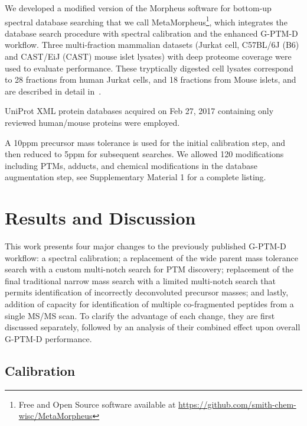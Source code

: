\documentclass[journal=jprobs,manuscript=article]{achemso}
\begin{document}
We developed a modified version of the Morpheus software for bottom-up spectral database searching\citep{Wenger_2013} that we call MetaMorpheus\footnote{Free and Open Source software available at \url{https://github.com/smith-chem-wisc/MetaMorpheus}}, which integrates the database search procedure with spectral calibration and the enhanced G-PTM-D workflow.
Three multi-fraction mammalian datasets (Jurkat cell, C57BL/6J (B6) and CAST/EiJ (CAST) mouse islet lysates) with deep proteome coverage were used to evaluate performance.
These tryptically digested cell lysates correspond to 28 fractions from human Jurkat cells, and 18 fractions from Mouse islets, and are described in detail in~\citep{Shortreed_2015, Cesnik_2016}.

UniProt XML protein databases acquired on Feb 27, 2017 containing only reviewed human/mouse proteins were employed.

A 10ppm precursor mass tolerance is used for the initial calibration step, and then reduced to 5ppm for subsequent searches.
We allowed 120 modifications including PTMs, adducts, and chemical modifications in the database augmentation step, see Supplementary Material 1 for a complete listing.

\section{Results and Discussion}

This work presents four major changes to the previously published G-PTM-D workflow:
a spectral calibration;
a replacement of the wide parent mass tolerance search with a custom multi-notch search for PTM discovery;
replacement of the final traditional narrow mass search with a limited multi-notch search that permits identification of incorrectly deconvoluted precursor masses;
and lastly, addition of capacity for identification of multiple co-fragmented peptides from a single MS/MS scan.
To clarify the advantage of each change, they are first discussed separately, followed by an analysis of their combined effect upon overall G-PTM-D performance.

\subsection{Calibration}
\end{document}
